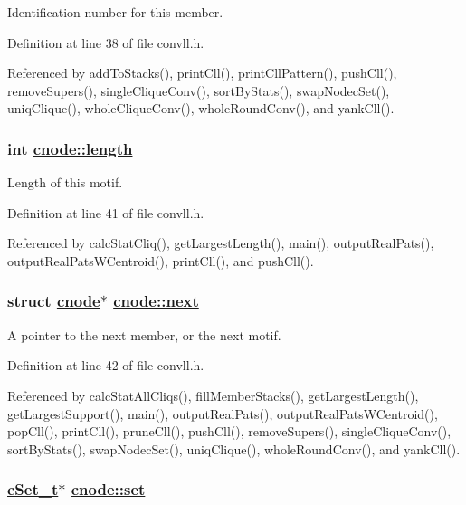 Identification number for this member. 

Definition at line 38 of file convll.h.

Referenced by add\-To\-Stacks(), print\-Cll(), print\-Cll\-Pattern(), push\-Cll(), remove\-Supers(), single\-Clique\-Conv(), sort\-By\-Stats(), swap\-Nodec\-Set(), uniq\-Clique(), whole\-Clique\-Conv(), whole\-Round\-Conv(), and yank\-Cll().\hypertarget{structcnode_o2}{
\subsubsection[length]{\setlength{\rightskip}{0pt plus 5cm}int \hyperlink{structcnode_o2}{cnode::length}}}
\label{structcnode_o2}


Length of this motif. 

Definition at line 41 of file convll.h.

Referenced by calc\-Stat\-Cliq(), get\-Largest\-Length(), main(), output\-Real\-Pats(), output\-Real\-Pats\-WCentroid(), print\-Cll(), and push\-Cll().\hypertarget{structcnode_o3}{
\subsubsection[next]{\setlength{\rightskip}{0pt plus 5cm}struct \hyperlink{structcnode}{cnode}$\ast$ \hyperlink{structcnode_o3}{cnode::next}}}
\label{structcnode_o3}


A pointer to the next member, or the next motif. 

Definition at line 42 of file convll.h.

Referenced by calc\-Stat\-All\-Cliqs(), fill\-Member\-Stacks(), get\-Largest\-Length(), get\-Largest\-Support(), main(), output\-Real\-Pats(), output\-Real\-Pats\-WCentroid(), pop\-Cll(), print\-Cll(), prune\-Cll(), push\-Cll(), remove\-Supers(), single\-Clique\-Conv(), sort\-By\-Stats(), swap\-Nodec\-Set(), uniq\-Clique(), whole\-Round\-Conv(), and yank\-Cll().\hypertarget{structcnode_o0}{
\subsubsection[set]{\setlength{\rightskip}{0pt plus 5cm}\hyperlink{structcSet__t}{c\-Set\_\-t}$\ast$ \hyperlink{structcnode_o0}{cnode::set}}}
\label{structcnode_o0}


